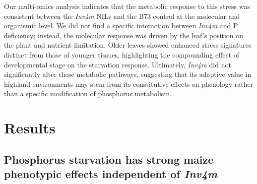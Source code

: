 \documentclass[9pt,twocolumn,twoside]{rilabRxiv}
\newcommand{\invfour}{\textit{Inv4m}\xspace}
\begin{document}
Our multi-omics analysis indicates that the metabolic response to this stress was consistent between the \invfour NILs and the B73 control at the molecular and organismic level.
We did not find a specific interaction between \invfour and P deficiency; instead, the molecular response was driven by the leaf's position on the plant and nutrient limitation.
Older leaves showed enhanced stress signatures distinct from those of younger tissues, highlighting the compounding effect of developmental stage on the starvation response.
Ultimately, \invfour did not significantly alter these metabolic pathways, suggesting that its adaptive value in highland environments may stem from its constitutive effects on phenology rather than a specific modification of phosphorus metabolism.



\section{Results}

\subsection*{Phosphorus starvation has strong maize phenotypic effects independent of \invfour}
\end{document}
